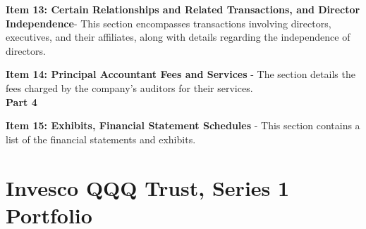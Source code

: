 \documentclass[logo,bsc,singlespacing,parskip]{infthesis}
\begin{document}
\textbf{Item 13: Certain Relationships and Related Transactions, and Director Independence}- This section encompasses transactions involving directors, executives, and their affiliates, along with details regarding the independence of directors.

\textbf{Item 14: Principal Accountant Fees and Services} - The section details the fees charged by the company’s auditors for their services. \\
 

\textbf{Part 4} 


\textbf{Item 15: Exhibits, Financial Statement Schedules} - This section contains a list of the financial statements and exhibits.


\chapter{Invesco QQQ Trust, Series 1 Portfolio \cite{InvescoQQQ}}
\end{document}
